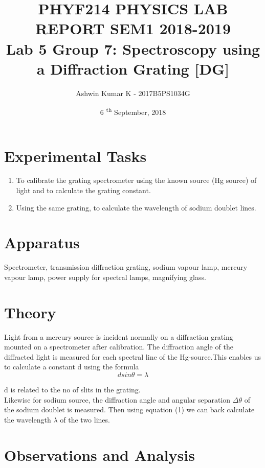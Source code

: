 \documentclass[11pt]{article}
\begin{document}
\author{Ashwin Kumar K - 2017B5PS1034G}
\title{PHYF214 PHYSICS LAB REPORT SEM1 2018-2019 \\ Lab 5 Group 7:  Spectroscopy using a Diffraction Grating [DG]
}
\date{6 \textsuperscript{th} September, 2018}
\maketitle

\section{Experimental Tasks}
\begin{enumerate}
    \item To calibrate the grating spectrometer using the known source (Hg source) of light and to calculate the grating constant.
    \item Using the same grating, to calculate the wavelength of sodium doublet lines.
\end{enumerate}
\section{Apparatus}
Spectrometer, transmission diffraction grating, sodium vapour lamp, mercury vapour lamp,
power supply for spectral lamps, magnifying glass.

\section{Theory}
Light from a mercury source is incident normally on a diffraction grating mounted on a spectrometer after calibration.
The diffraction angle of the diffracted light is measured for each spectral line of the
Hg-source.This enables us to calculate a constant d using the formula  
\begin{equation}
    dsin\theta=\lambda
\end{equation}

d is related to the no of slits in the grating.\\
Likewise for sodium source, the diffraction angle and angular separation $\Delta \theta $ of the
sodium doublet is measured. Then using equation (1) we can back calculate the wavelength $\lambda$ of the two lines.




\section{Observations and Analysis}
\end{document}

